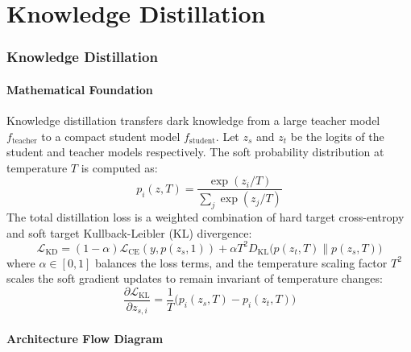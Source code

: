 \newpage
\part{Knowledge Distillation}

\section{Knowledge Distillation}

\subsection{Mathematical Foundation}
Knowledge distillation transfers dark knowledge from a large teacher model $f_{\text{teacher}}$ to a compact student model $f_{\text{student}}$. Let $z_s$ and $z_t$ be the logits of the student and teacher models respectively. The soft probability distribution at temperature $T$ is computed as:
\begin{equation}
  p_i(z, T) = \frac{\exp(z_i / T)}{\sum_j \exp(z_j / T)}
\end{equation}
The total distillation loss is a weighted combination of hard target cross-entropy and soft target Kullback-Leibler (KL) divergence:
\begin{equation}
  \mathcal{L}_{\text{KD}} = (1-\alpha) \mathcal{L}_{\text{CE}}(y, p(z_s, 1)) + \alpha T^2 D_{\text{KL}}\bigl( p(z_t, T) \parallel p(z_s, T) \bigr)
\end{equation}
where $\alpha \in [0, 1]$ balances the loss terms, and the temperature scaling factor $T^2$ scales the soft gradient updates to remain invariant of temperature changes:
\begin{equation}
  \frac{\partial \mathcal{L}_{\text{KL}}}{\partial z_{s,i}} = \frac{1}{T} \bigl( p_i(z_s, T) - p_i(z_t, T) \bigr)
\end{equation}

\subsection{Architecture Flow Diagram}

